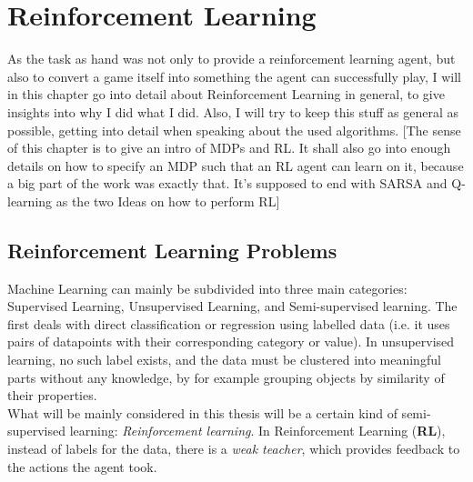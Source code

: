 
\chapter{Reinforcement Learning} %

\label{Reinforcement Learning} %


\newcommand{\keyword}[1]{\textit{#1}}
\newcommand{\tabhead}[1]{\textbf{#1}}
\newcommand{\code}[1]{\texttt{#1}}
\newcommand{\file}[1]{\texttt{\bfseries#1}}
\newcommand{\option}[1]{\texttt{\itshape#1}}


As the task as hand was not only to provide a reinforcement learning agent, but also to convert a game itself into something the agent can successfully play, I will in this chapter go into detail about Reinforcement Learning in general, to give insights into why I did what I did. Also, I will try to keep this stuff as general as possible, getting into detail when speaking about the used algorithms.
[The sense of this chapter is to give an intro of MDPs and RL. It shall also go into enough details on how to specify an MDP such that an RL agent can learn on it, because a big part of  the work was exactly that. It’s supposed to end with SARSA and Q-learning as the two Ideas on how to perform RL]

\section{Reinforcement Learning Problems}

Machine Learning can mainly be subdivided into three main categories: Supervised Learning, Unsupervised Learning, and Semi-supervised learning. The first deals with direct classification or regression using labelled data (i.e. it uses pairs of datapoints with their corresponding category or value). In unsupervised learning, no such label exists, and the data must be clustered into meaningful parts without any knowledge, by for example grouping objects by similarity of their properties.\\
What will be mainly considered in this thesis will be a certain kind of semi-supervised learning: \keyword{Reinforcement learning}. In Reinforcement Learning (\textbf{RL}), instead of labels for the data, there is a \textit{weak teacher}, which provides feedback to the actions the agent took.

